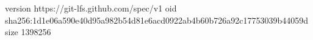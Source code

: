 version https://git-lfs.github.com/spec/v1
oid sha256:1d1e06a590e40d95a982b54d81e6acd0922ab4b60b726a92c17753039b44059d
size 1398256
